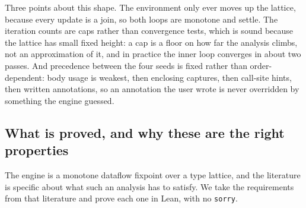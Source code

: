 \documentclass{article}
\newcommand{\code}{\lstinline}
\begin{document}
Three points about this shape. The environment only ever moves up the lattice, because every update is a join, so both loops are monotone and settle. The iteration counts are caps rather than convergence tests, which is sound because the lattice has small fixed height: a cap is a floor on how far the analysis climbs, not an approximation of it, and in practice the inner loop converges in about two passes. And precedence between the four seeds is fixed rather than order-dependent: body usage is weakest, then enclosing captures, then call-site hints, then written annotations, so an annotation the user wrote is never overridden by something the engine guessed.

\subsection{What is proved, and why these are the right properties}\label{app:ti-proofs}

The engine is a monotone dataflow fixpoint over a type lattice, and the literature is specific about what such an analysis has to satisfy. We take the requirements from that literature and prove each one in Lean, with no \code{sorry}.
\end{document}
